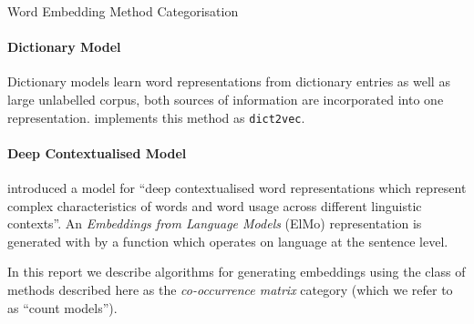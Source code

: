 \documentclass{ucetd}
\begin{document}
\begin{infobox}{Word Embedding Method Categorisation}
  \paragraph{Dictionary Model}\label{dictionary-model} Dictionary models learn word representations from dictionary entries as well as large unlabelled corpus, both sources of information are incorporated into one representation. \parencite{tissier-etal-2017-dict2vec} implements this method as \texttt{dict2vec}.
  \paragraph{Deep Contextualised Model}\label{deep-contextualised-model} \parencite{peters18-deep-contex-word-repres} introduced a model for ``deep contextualised word representations which represent complex characteristics of words and word usage across different linguistic contexts''. An \emph{Embeddings from Language Models} (ElMo) representation is generated with by a function which operates on language at the sentence level.
\end{infobox}
In this report we describe algorithms for generating embeddings using the class of methods described here as the \emph{co-occurrence matrix} category (which we refer to as ``count models'').
\end{document}
